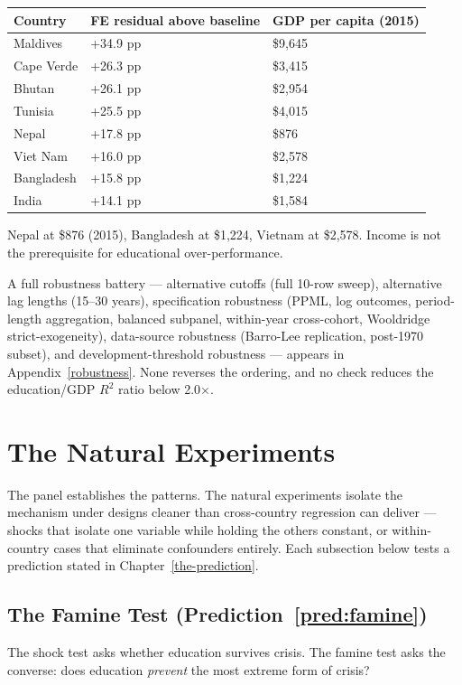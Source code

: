 \documentclass[12pt,letterpaper]{article}
\begin{document}
\begin{longtable}[]{@{}lll@{}}
\toprule
Country & FE residual above baseline & GDP per capita (2015) \\
\midrule
\endhead
Maldives & +34.9 pp & \$9,645 \\
Cape Verde & +26.3 pp & \$3,415 \\
Bhutan & +26.1 pp & \$2,954 \\
Tunisia & +25.5 pp & \$4,015 \\
Nepal & +17.8 pp & \$876 \\
Viet Nam & +16.0 pp & \$2,578 \\
Bangladesh & +15.8 pp & \$1,224 \\
India & +14.1 pp & \$1,584 \\
\bottomrule
\end{longtable}

Nepal at \$876 (2015), Bangladesh at \$1,224, Vietnam at \$2,578. Income is not the prerequisite for educational over-performance.

A full robustness battery --- alternative cutoffs (full 10-row sweep),
alternative lag lengths (15--30 years), specification robustness
(PPML, log outcomes, period-length aggregation, balanced subpanel,
within-year cross-cohort, Wooldridge strict-exogeneity), data-source
robustness (Barro-Lee replication, post-1970 subset), and
development-threshold robustness --- appears in Appendix~\ref{robustness}.
None reverses the ordering, and no check reduces the education/GDP
$R^2$ ratio below 2.0$\times$.


\section{The Natural Experiments}\label{natural-experiments}

The panel establishes the patterns. The natural experiments isolate
the mechanism under designs cleaner than cross-country regression can
deliver --- shocks that isolate one variable while holding the others
constant, or within-country cases that eliminate confounders
entirely. Each subsection below tests a prediction stated in
Chapter~\ref{the-prediction}.

\subsection{The Famine Test (Prediction~\ref{pred:famine})}\label{the-famine-test}

The shock test asks whether education survives crisis. The famine test asks the converse: does education \emph{prevent} the most extreme form of crisis?
\end{document}
